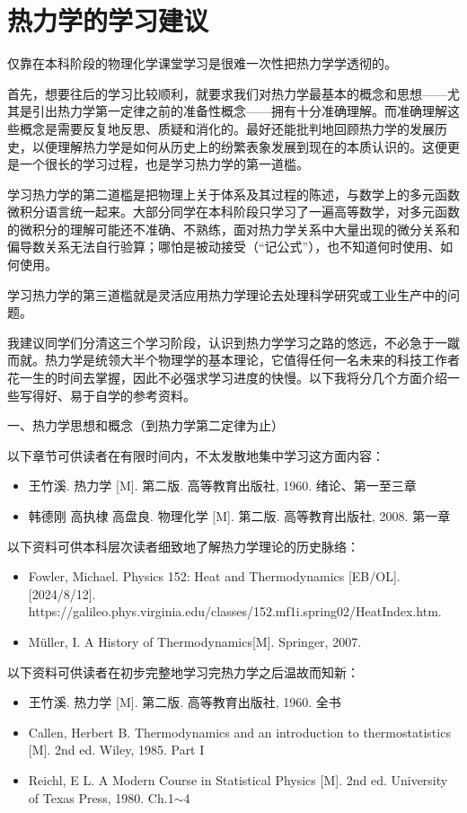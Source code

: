 \documentclass[main.tex]{subfiles}
\begin{document}
\section{热力学的学习建议}\label{I.1 learning_advices}
仅靠在本科阶段的物理化学课堂学习是很难一次性把热力学学透彻的。

首先，想要往后的学习比较顺利，就要求我们对热力学最基本的概念和思想——尤其是引出热力学第一定律之前的准备性概念——拥有十分准确理解。而准确理解这些概念是需要反复地反思、质疑和消化的。最好还能批判地回顾热力学的发展历史，以便理解热力学是如何从历史上的纷繁表象发展到现在的本质认识的。这便更是一个很长的学习过程，也是学习热力学的第一道槛。

学习热力学的第二道槛是把物理上关于体系及其过程的陈述，与数学上的多元函数微积分语言统一起来。大部分同学在本科阶段只学习了一遍高等数学，对多元函数的微积分的理解可能还不准确、不熟练，面对热力学关系中大量出现的微分关系和偏导数关系无法自行验算；哪怕是被动接受（“记公式”），也不知道何时使用、如何使用。

学习热力学的第三道槛就是灵活应用热力学理论去处理科学研究或工业生产中的问题。

我建议同学们分清这三个学习阶段，认识到热力学学习之路的悠远，不必急于一蹴而就。热力学是统领大半个物理学的基本理论，它值得任何一名未来的科技工作者花一生的时间去掌握，因此不必强求学习进度的快慢。以下我将分几个方面介绍一些写得好、易于自学的参考资料。

一、热力学思想和概念（到热力学第二定律为止）

以下章节可供读者在有限时间内，不太发散地集中学习这方面内容：
\begin{itemize}
    \item 王竹溪. 热力学 [M]. 第二版. 高等教育出版社, 1960. 绪论、第一至三章
    \item 韩德刚 高执棣 高盘良. 物理化学 [M]. 第二版. 高等教育出版社, 2008. 第一章
\end{itemize}
以下资料可供本科层次读者细致地了解热力学理论的历史脉络：
\begin{itemize}
    \item Fowler, Michael. Physics 152: Heat and Thermodynamics [EB/OL]. [2024/8/12]. https://galileo.phys.virginia.edu/classes/152.mf1i.spring02/HeatIndex.htm.
    \item Müller, I. A History of Thermodynamics[M]. Springer, 2007.
\end{itemize}
以下资料可供读者在初步完整地学习完热力学之后温故而知新：
\begin{itemize}
    \item 王竹溪. 热力学 [M]. 第二版. 高等教育出版社, 1960. 全书
    \item Callen, Herbert B. Thermodynamics and an introduction to thermostatistics [M]. 2nd ed. Wiley, 1985. Part I
    \item Reichl, E L. A Modern Course in Statistical Physics [M]. 2nd ed. University of Texas Press, 1980. Ch.1$\sim$4
\end{itemize}
\end{document}
